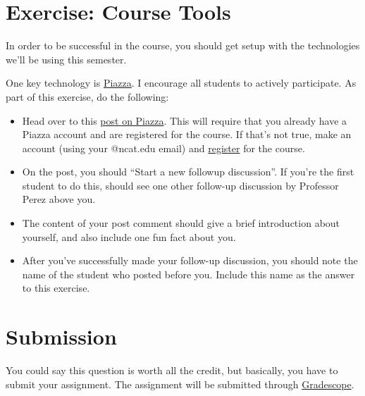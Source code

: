 \documentclass [12pt]{article}
\begin{document}

\section{Exercise: Course Tools}
 In order to be successful in the course, you should get setup with the technologies we'll be using this semester. 

One key technology is \href{https://piazza.com/north_carolina_at_state_university/spring2022/comp285/home}{Piazza}. I encourage all students to actively participate. As part of this exercise, do the following:

\begin{itemize}
    \item Head over to this \href{https://piazza.com/class/kx9c6qsst5i7mo?cid=10}{post on Piazza}. This will require that you already have a Piazza account and are registered for the course. If that's not true, make an account (using your @ncat.edu email) and  \href{https://piazza.com/north_carolina_at_state_university/spring2022/comp285}{register} for the course.
    \item On the post, you should ``Start a new followup discussion''. If you're the first student to do this, should see one other follow-up discussion by Professor Perez above you. 
    \item The content of your post comment should give a brief introduction about yourself, and also include one fun fact about you.
    \item After you've successfully made your follow-up discussion, you should note the name of the student who posted before you. Include this name as the answer to this exercise.
\end{itemize}



\section{Submission}

You could say this question is worth all the credit, but basically, you have to submit your assignment. The assignment will be submitted through \href{https://www.gradescope.com/courses/350304}{Gradescope}. 
\end{document}

